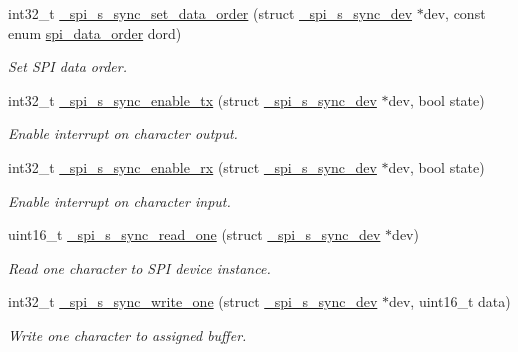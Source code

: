 \begin{DoxyCompactItemize}
int32\+\_\+t \hyperlink{group__hpl__spi_ga5cab059286805d618d2bc11da8e43d94}{\+\_\+spi\+\_\+s\+\_\+sync\+\_\+set\+\_\+data\+\_\+order} (struct \hyperlink{group__hpl__spi_ga36cf082f9d7764b69f43a52f039e7165}{\+\_\+spi\+\_\+s\+\_\+sync\+\_\+dev} $\ast$dev, const enum \hyperlink{group__hpl__spi_gabaa69dbc0601cb5b1e2681400598a4b2}{spi\+\_\+data\+\_\+order} dord)
\begin{DoxyCompactList}\small\item\em Set S\+PI data order. \end{DoxyCompactList}\item 
int32\+\_\+t \hyperlink{group__hpl__spi_ga9b51eaa184b1d70f894ad55e773df3b9}{\+\_\+spi\+\_\+s\+\_\+sync\+\_\+enable\+\_\+tx} (struct \hyperlink{group__hpl__spi_ga36cf082f9d7764b69f43a52f039e7165}{\+\_\+spi\+\_\+s\+\_\+sync\+\_\+dev} $\ast$dev, bool state)
\begin{DoxyCompactList}\small\item\em Enable interrupt on character output. \end{DoxyCompactList}\item 
int32\+\_\+t \hyperlink{group__hpl__spi_ga2dd07ddcb66c0451c56c4fa2a6a12818}{\+\_\+spi\+\_\+s\+\_\+sync\+\_\+enable\+\_\+rx} (struct \hyperlink{group__hpl__spi_ga36cf082f9d7764b69f43a52f039e7165}{\+\_\+spi\+\_\+s\+\_\+sync\+\_\+dev} $\ast$dev, bool state)
\begin{DoxyCompactList}\small\item\em Enable interrupt on character input. \end{DoxyCompactList}\item 
uint16\+\_\+t \hyperlink{group__hpl__spi_ga3bc398fcaa495592607952f4f0a2f55e}{\+\_\+spi\+\_\+s\+\_\+sync\+\_\+read\+\_\+one} (struct \hyperlink{group__hpl__spi_ga36cf082f9d7764b69f43a52f039e7165}{\+\_\+spi\+\_\+s\+\_\+sync\+\_\+dev} $\ast$dev)
\begin{DoxyCompactList}\small\item\em Read one character to S\+PI device instance. \end{DoxyCompactList}\item 
int32\+\_\+t \hyperlink{group__hpl__spi_gaa5c691af95be44b8f2139379df54ba80}{\+\_\+spi\+\_\+s\+\_\+sync\+\_\+write\+\_\+one} (struct \hyperlink{group__hpl__spi_ga36cf082f9d7764b69f43a52f039e7165}{\+\_\+spi\+\_\+s\+\_\+sync\+\_\+dev} $\ast$dev, uint16\+\_\+t data)
\begin{DoxyCompactList}\small\item\em Write one character to assigned buffer. \end{DoxyCompactList}\item 

\end{DoxyCompactItemize}

